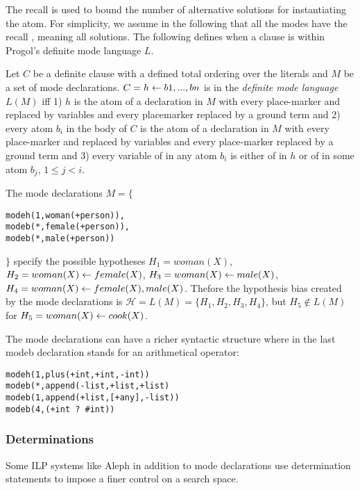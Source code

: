 The recall is used to bound the number of alternative solutions for instantiating
the atom. For simplicity, we assume in the following that all the modes have the
recall \tc{*}, meaning all solutions. The following defines when a clause is within Progol's definite mode language $L$.

\begin{defn}\label{definition_definite_mode_language}\cite{muggleton1995inverse}
Let $C$ be a definite clause with a
defined total ordering over the literals and $M$ be a set of mode declarations.
$C = h \leftarrow b1, ..., bn$ is in the \emph{definite mode language} $L(M)$ iff 1) $h$ is the atom
of a  declaration in $M$ with every place-marker  and  replaced by
variables and every placemarker  replaced by a ground term and 2) every
atom $b_i$ in the body of $C$ is the atom of a  declaration in $M$ with every
place-marker  and  replaced by variables and every place-marker 
replaced by a ground term and 3) every variable of  in any atom $b_i$ is either
of  in $h$ or of  in some atom $b_j$, $1 \le j < i$.
\end{defn}

\begin{exmp}
The mode declarations $M=\{$
\begin{lstlisting}
modeh(1,woman(+person)),
modeb(*,female(+person)),
modeb(*,male(+person))
\end{lstlisting}
$\}$
specify the possible hypotheses
$H_1=woman(X)$,
$H_2=woman(X) \leftarrow female(X)$,
$H_3=woman(X) \leftarrow male(X)$,
$H_4=woman(X) \leftarrow female(X), male(X)$.
Thefore the hypothesis bias created by the mode declarations 
is $\mathcal{H}=L(M)=\{H_1, H_2, H_3, H_4\}$, but $H_5 \not\in L(M)$ for
$H_5=woman(X) \leftarrow cook(X)$.
\end{exmp}

The mode declarations can have a richer syntactic structure where  in the last modeb declaration stands for an arithmetical operator:
\begin{exmp}\cite{muggleton1995inverse}
\begin{lstlisting}
modeh(1,plus(+int,+int,-int))
modeb(*,append(-list,+list,+list)
modeb(1,append(+list,[+any],-list))
modeb(4,(+int ? #int))
\end{lstlisting}
\end{exmp}

\subsubsection{Determinations}
Some ILP systems like Aleph in addition to mode declarations use determination statements\cite{aleph2007} to impose a finer control on a search space.

